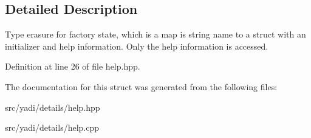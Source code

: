 \subsection{Detailed Description}
Type erasure for factory state, which is a map is string name to a struct with an initializer and help information. Only the help information is accessed. 

Definition at line 26 of file help.\+hpp.



The documentation for this struct was generated from the following files\+:\begin{DoxyCompactItemize}
\item 
src/yadi/details/help.\+hpp\item 
src/yadi/details/help.\+cpp\end{DoxyCompactItemize}
